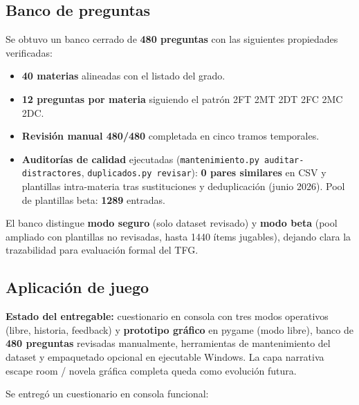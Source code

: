 \documentclass[11pt,a4paper]{article}
\begin{document}
\subsection{Banco de preguntas}

Se obtuvo un banco cerrado de \textbf{480 preguntas} con las siguientes propiedades verificadas:
\begin{itemize}
  \item \textbf{40 materias} alineadas con el listado del grado.
  \item \textbf{12 preguntas por materia} siguiendo el patrón 2FT 2MT 2DT 2FC 2MC 2DC.
  \item \textbf{Revisión manual 480/480} completada en cinco tramos temporales.
  \item \textbf{Auditorías de calidad} ejecutadas (\texttt{mantenimiento.py auditar-distractores}, \texttt{duplicados.py revisar}): \textbf{0 pares similares} en CSV y plantillas intra-materia tras sustituciones y deduplicación (junio 2026). Pool de plantillas beta: \textbf{1289} entradas.
\end{itemize}

El banco distingue \textbf{modo seguro} (solo dataset revisado) y \textbf{modo beta} (pool ampliado con plantillas no revisadas, hasta 1440 ítems jugables), dejando clara la trazabilidad para evaluación formal del TFG.

\subsection{Aplicación de juego}

\textbf{Estado del entregable:} cuestionario en consola con tres modos operativos (libre, historia, feedback) y \textbf{prototipo gráfico} en pygame (modo libre), banco de \textbf{480 preguntas} revisadas manualmente, herramientas de mantenimiento del dataset y empaquetado opcional en ejecutable Windows. La capa narrativa escape room / novela gráfica completa queda como evolución futura.

Se entregó un cuestionario en consola funcional:
\end{document}
